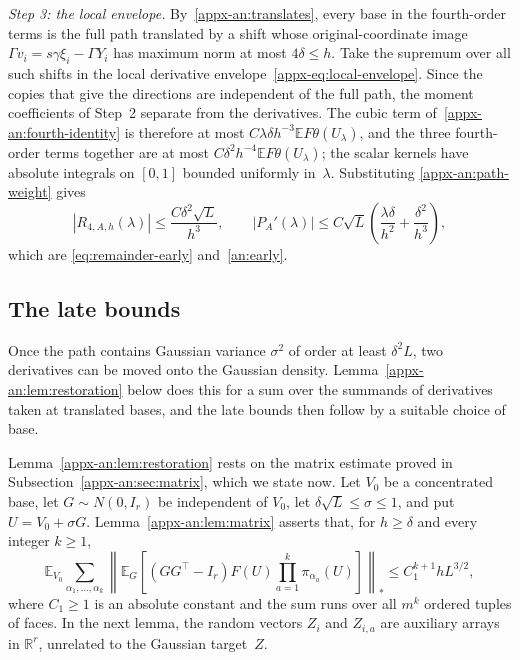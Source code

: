 \documentclass[11pt,letterpaper]{article}
\newif\ifshowrev
\newenvironment{revblock}{\ifshowrev\color{revblue}%
\hypersetup{linkcolor=revblue,citecolor=revblue,urlcolor=revblue}\fi}{}
\newif\ifshowtrim
\newcommand{\trim}[1]{\ifshowtrim{\color{revblue}%
\hypersetup{linkcolor=revblue,citecolor=revblue,urlcolor=revblue}#1}\else#1\fi}
\newif\ifshowskill
\newcommand{\skl}[1]{\ifshowskill{\color{revblue}%
\hypersetup{linkcolor=revblue,citecolor=revblue,urlcolor=revblue}#1}\else#1\fi}
\theoremstyle{remark}
\newcommand{\E}{\mathbb E}
\newcommand{\R}{\mathbb R}
\begin{document}
\begin{revblock}
\emph{Step 3: the local envelope.} By~\eqref{appx-an:translates}, every
base in the fourth-order terms is the full path translated by a shift
whose original-coordinate image \(\Gamma v_i=s\gamma\xi_i-\Gamma Y_i\)
has maximum norm at most \(4\delta\le h\). Take the supremum over all
such shifts in the local derivative envelope~\eqref{appx-eq:local-envelope}.
Since the \trim{copies that give the} directions are independent of the full path, the moment
coefficients of Step~2 separate from the derivatives. The cubic term
of~\eqref{appx-an:fourth-identity} is therefore at most
\(C\lambda\delta h^{-3}\E F\theta(U_\lambda)\), and the three
fourth-order terms together are at most
\(C\delta^2h^{-4}\E F\theta(U_\lambda)\); the scalar kernels have absolute
integrals on \([0,1]\) bounded uniformly in~\(\lambda\). Substituting
\eqref{appx-an:path-weight} gives
\[
 |R_{4,A,h}(\lambda)|\le\frac{C\delta^2\sqrt L}{h^3},
 \qquad
 |P_A'(\lambda)|\le C\sqrt L\left(\frac{\lambda\delta}{h^2}
                         +\frac{\delta^2}{h^3}\right),
\]
which are \eqref{eq:remainder-early} and~\eqref{an:early}.

\subsection{The late bounds}
\label{appx-an:sec:restoration}

Once the path contains Gaussian variance \(\sigma^2\) of order at least
\(\delta^2L\), two derivatives can be moved onto the Gaussian density.
Lemma~\ref{appx-an:lem:restoration} below does this for a sum over the summands
of derivatives taken at translated bases, and the late bounds then
follow by a suitable choice of base.

Lemma~\ref{appx-an:lem:restoration} rests on the matrix estimate proved
in Subsection~\ref{appx-an:sec:matrix}, which we state now. Let
\(V_0\) be a concentrated base, let \(G\sim N(0,I_r)\) be independent of
\(V_0\), let \(\delta\sqrt L\le\sigma\le1\), and put \(U=V_0+\sigma G\).
Lemma~\ref{appx-an:lem:matrix} asserts that, for \(h\ge\delta\) and every
integer \(k\ge1\),
\begin{equation}
 \E_{V_0}\sum_{\alpha_1,\ldots,\alpha_k}
 \left\|\E_G\left[(GG^\top-I_r)F(U)
                \prod_{a=1}^k\pi_{\alpha_a}(U)\right]\right\|_*
 \le C_1^{k+1}hL^{3/2},
 \label{appx-an:matrix-bound}
\end{equation}
where \(C_1\ge1\) is an absolute constant\trim{ and the} sum runs over
all \(m^k\) ordered tuples of faces.
\skl{In the next lemma, the random vectors \(Z_i\) and \(Z_{i,a}\) are
auxiliary arrays in \(\R^r\), unrelated to the Gaussian target~\(Z\).}


\end{revblock}
\end{document}
